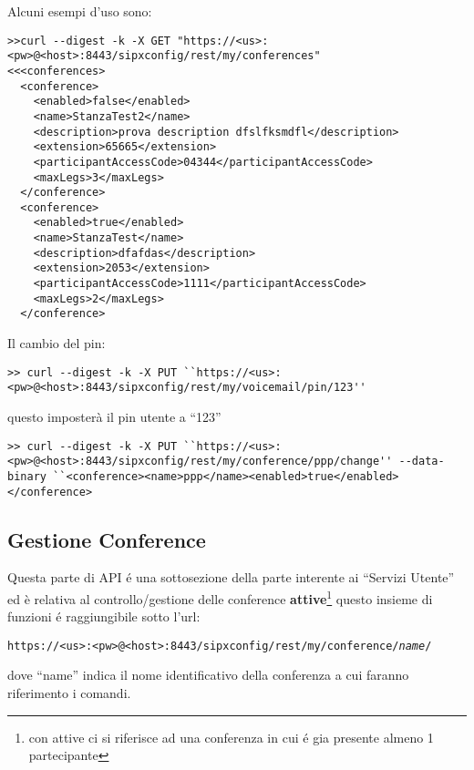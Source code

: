 \bigskip
Alcuni esempi d'uso sono:
\bigskip

\begin{lstlisting}
>>curl --digest -k -X GET "https://<us>:<pw>@<host>:8443/sipxconfig/rest/my/conferences"
<<<conferences>
  <conference>
    <enabled>false</enabled>
    <name>StanzaTest2</name>
    <description>prova description dfslfksmdfl</description>
    <extension>65665</extension>
    <participantAccessCode>04344</participantAccessCode>
    <maxLegs>3</maxLegs>
  </conference>
  <conference>
    <enabled>true</enabled>
    <name>StanzaTest</name>
    <description>dfafdas</description>
    <extension>2053</extension>
    <participantAccessCode>1111</participantAccessCode>
    <maxLegs>2</maxLegs>
  </conference>
\end{lstlisting}
\bigskip

Il cambio del pin:
\bigskip
\begin{lstlisting}
>> curl --digest -k -X PUT ``https://<us>:<pw>@<host>:8443/sipxconfig/rest/my/voicemail/pin/123''
\end{lstlisting}
\bigskip

questo imposter\`a il pin utente a ``123''
\bigskip
\begin{lstlisting}
>> curl --digest -k -X PUT ``https://<us>:<pw>@<host>:8443/sipxconfig/rest/my/conference/ppp/change'' --data-binary ``<conference><name>ppp</name><enabled>true</enabled></conference>
\end{lstlisting}

\subsection{Gestione Conference}

Questa parte di API \'e una sottosezione della parte interente ai ``Servizi Utente'' ed \`e relativa al controllo/gestione delle conference 
\textbf{attive}\footnote{con attive ci si riferisce ad una conferenza in cui \'e gia presente almeno 1 partecipante}
questo insieme di funzioni \'e raggiungibile sotto l'url:

\bigskip

\texttt{https://<us>:<pw>@<host>:8443/sipxconfig/rest/my/conference/\emph{name}/}

dove ``name'' indica il nome identificativo della conferenza a cui faranno riferimento i comandi.

\bigskip


